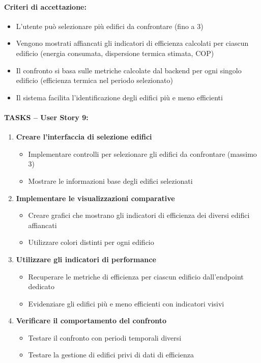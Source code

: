 \paragraph*{Criteri di accettazione:}
\begin{itemize}
    \item L'utente può selezionare più edifici da confrontare (fino a 3)
    \item Vengono mostrati affiancati gli indicatori di efficienza calcolati per ciascun edificio (energia consumata, dispersione termica stimata, COP)
    \item Il confronto si basa sulle metriche calcolate dal backend per ogni singolo edificio (efficienza termica nel periodo selezionato)
    \item Il sistema facilita l'identificazione degli edifici più e meno efficienti
\end{itemize}

\paragraph*{TASKS – User Story 9:}
\begin{enumerate}
    \item \textbf{Creare l'interfaccia di selezione edifici}
    \begin{itemize}
        \item Implementare controlli per selezionare gli edifici da confrontare (massimo 3)
        \item Mostrare le informazioni base degli edifici selezionati
    \end{itemize}
    \item \textbf{Implementare le visualizzazioni comparative}
    \begin{itemize}
        \item Creare grafici che mostrano gli indicatori di efficienza dei diversi edifici affiancati
        \item Utilizzare colori distinti per ogni edificio
    \end{itemize}
    \item \textbf{Utilizzare gli indicatori di performance}
    \begin{itemize}
        \item Recuperare le metriche di efficienza per ciascun edificio dall'endpoint dedicato
        \item Evidenziare gli edifici più e meno efficienti con indicatori visivi
    \end{itemize}
    \item \textbf{Verificare il comportamento del confronto}
    \begin{itemize}
        \item Testare il confronto con periodi temporali diversi
        \item Testare la gestione di edifici privi di dati di efficienza
    \end{itemize}
\end{enumerate}


